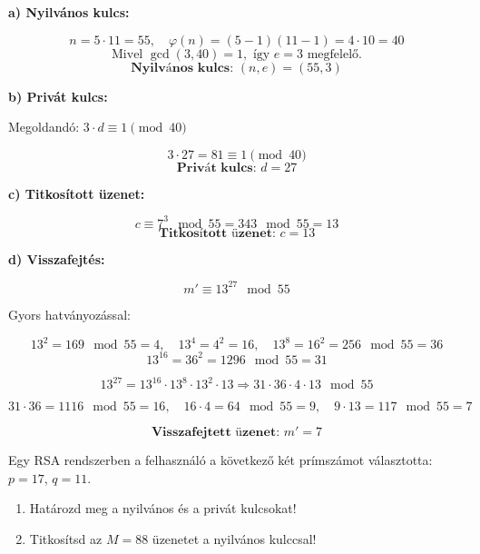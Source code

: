 \begin{solution}
\textbf{a) Nyilvános kulcs:}

\[
n=5\cdot11=55,\quad\varphi(n)=(5-1)(11-1)=4\cdot10=40
\]
\[
\text{Mivel }\gcd(3,40)=1,\text{ így }e=3\text{ megfelelő.}
\]
\[
\textbf{Nyilvános kulcs: }(n,e)=(55,3)
\]

\textbf{b) Privát kulcs:}

Megoldandó: $3\cdot d\equiv1\pmod{40}$

\[
3\cdot27=81\equiv1\pmod{40}
\]
\[
\textbf{Privát kulcs: }d=27
\]

\textbf{c) Titkosított üzenet:}

\[
c\equiv7^{3}\mod 55=343\mod 55=13
\]
\[
\textbf{Titkosított üzenet: }c=13
\]

\textbf{d) Visszafejtés:}

\[
m'\equiv13^{27}\mod 55
\]

Gyors hatványozással:

\[
13^{2}=169\mod 55=4,\quad13^{4}=4^{2}=16,\quad13^{8}=16^{2}=256\mod 55=36
\]
\[
13^{16}=36^{2}=1296\mod 55=31
\]

\[
13^{27}=13^{16}\cdot13^{8}\cdot13^{2}\cdot13\Rightarrow31\cdot36\cdot4\cdot13\mod 55
\]

\[
31\cdot36=1116\mod 55=16,\quad16\cdot4=64\mod 55=9,\quad9\cdot13=117\mod 55=7
\]

\[
\textbf{Visszafejtett üzenet: }m'=7
\]
\end{solution}
\begin{extraproblem}
Egy RSA rendszerben a felhasználó a következő két prímszámot választotta: $p=17$, $q=11$.
\begin{enumerate}
    \item Határozd meg a nyilvános és a privát kulcsokat!
    \item Titkosítsd az \( M = 88 \) üzenetet a nyilvános kulccsal!
\end{enumerate}
\end{extraproblem}

